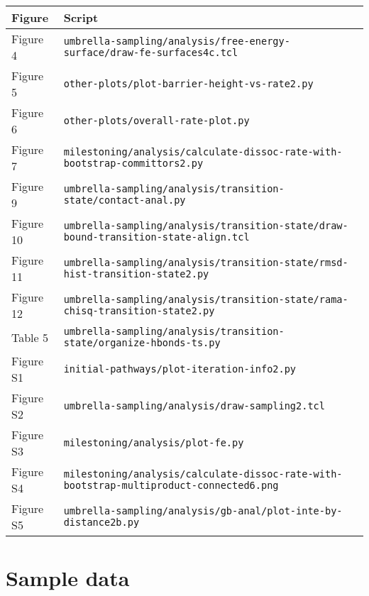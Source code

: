 \documentclass{article}      %
\begin{document}
\begin{tabular}{|l|l|}
\hline 
Figure & Script \\
\hline
Figure 4 & \verb+umbrella-sampling/analysis/free-energy-surface/draw-fe-surfaces4c.tcl+ \\ %
Figure 5 & \verb+other-plots/plot-barrier-height-vs-rate2.py+ \\ %
Figure 6 & \verb+other-plots/overall-rate-plot.py+ \\ %
Figure 7 & \verb+milestoning/analysis/calculate-dissoc-rate-with-bootstrap-committors2.py+ \\
Figure 9 & \verb+umbrella-sampling/analysis/transition-state/contact-anal.py+\\ %
Figure 10 & \verb+umbrella-sampling/analysis/transition-state/draw-bound-transition-state-align.tcl+ \\ %
Figure 11 & \verb+umbrella-sampling/analysis/transition-state/rmsd-hist-transition-state2.py+ \\ %
Figure 12 & \verb+umbrella-sampling/analysis/transition-state/rama-chisq-transition-state2.py+ \\ %
Table 5 & \verb+umbrella-sampling/analysis/transition-state/organize-hbonds-ts.py+  \\ %
Figure S1 & \verb+initial-pathways/plot-iteration-info2.py+ \\ %
Figure S2 & \verb+umbrella-sampling/analysis/draw-sampling2.tcl+ \\ %
Figure S3 & \verb+milestoning/analysis/plot-fe.py+ \\ %
Figure S4 & \verb+milestoning/analysis/calculate-dissoc-rate-with-bootstrap-multiproduct-connected6.png+\\ %
Figure S5 & \verb+umbrella-sampling/analysis/gb-anal/plot-inte-by-distance2b.py+ \\ %
\hline
\end{tabular}
\section{Sample data}
\end{document}
